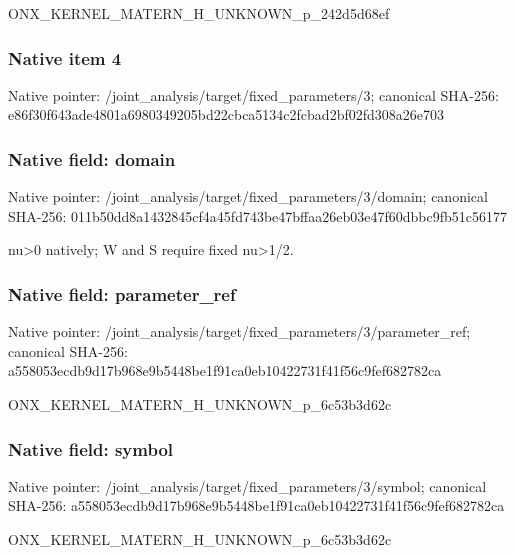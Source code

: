 \documentclass[10pt,a4paper]{article}
\begin{document}
\begingroup\raggedright\sloppy ONX\_\allowbreak{}KERNEL\_\allowbreak{}MATERN\_\allowbreak{}H\_\allowbreak{}UNKNOWN\_\allowbreak{}p\_\allowbreak{}242d5d68ef\par\endgroup

\subsubsection{Native item 4}
Native pointer: /joint\_\allowbreak{}analysis/target/fixed\_\allowbreak{}parameters/3; canonical SHA-256: e86f30f643ade4801a6980349205bd22cbca5134c2fcbad2bf02fd308a26e703

\subsubsection{Native field: domain}
Native pointer: /joint\_\allowbreak{}analysis/target/fixed\_\allowbreak{}parameters/3/domain; canonical SHA-256: 011b50dd8a1432845cf4a45fd743be47bffaa26eb03e47f60dbbc9fb51c56177

\begingroup\raggedright\sloppy nu>0 natively;\allowbreak{} W and S require fixed nu>1/\allowbreak{}2.\par\endgroup

\subsubsection{Native field: parameter\_\allowbreak{}ref}
Native pointer: /joint\_\allowbreak{}analysis/target/fixed\_\allowbreak{}parameters/3/parameter\_\allowbreak{}ref; canonical SHA-256: a558053ecdb9d17b968e9b5448be1f91ca0eb10422731f41f56c9fef682782ca

\begingroup\raggedright\sloppy ONX\_\allowbreak{}KERNEL\_\allowbreak{}MATERN\_\allowbreak{}H\_\allowbreak{}UNKNOWN\_\allowbreak{}p\_\allowbreak{}6c53b3d62c\par\endgroup

\subsubsection{Native field: symbol}
Native pointer: /joint\_\allowbreak{}analysis/target/fixed\_\allowbreak{}parameters/3/symbol; canonical SHA-256: a558053ecdb9d17b968e9b5448be1f91ca0eb10422731f41f56c9fef682782ca

\begingroup\raggedright\sloppy ONX\_\allowbreak{}KERNEL\_\allowbreak{}MATERN\_\allowbreak{}H\_\allowbreak{}UNKNOWN\_\allowbreak{}p\_\allowbreak{}6c53b3d62c\par\endgroup
\end{document}

